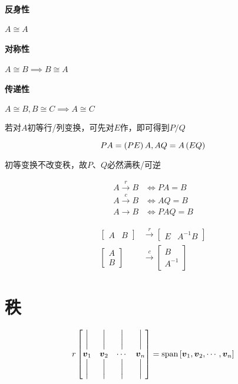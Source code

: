 \documentclass{article}
\begin{document}
\paragraph{反身性}$A\cong A$

\paragraph{对称性}$A\cong B\implies B\cong A$

\paragraph{传递性}$A\cong B,B\cong C\implies A\cong C$

若对$A$初等行/列变换，可先对$E$作，即可得到$P/Q$

\[PA=\left(PE\right)A,AQ=A\left(EQ\right)\]

初等变换不改变秩，故$P$、$Q$必然满秩/可逆

\[\begin{aligned}
        A\overset{r}\to B & \iff PA=B  \\
        A\overset{c}\to B & \iff AQ=B  \\
        A\to B            & \iff PAQ=B
    \end{aligned}\]

\[\begin{aligned}
        \begin{bmatrix}A&B\end{bmatrix}
         & \overset{r}\to
        \begin{bmatrix}E&A^{-1}B\end{bmatrix} \\
        \begin{bmatrix}A\\B\end{bmatrix}
         & \overset{c}\to\begin
        {bmatrix}B                            \\A^{-1}\end{bmatrix}
    \end{aligned}\]

\section{秩}

\begin{definition}
    \[r\begin{bmatrix}
            \bigg| & \bigg| & \bigg| & \bigg| \\
            \boldsymbol v_1   & \boldsymbol v_2   & \cdots & \boldsymbol v_n   \\
            \bigg| & \bigg| & \bigg| & \bigg|
        \end{bmatrix}
        =\mathrm{span}\left[\boldsymbol v_1,\boldsymbol v_2,\cdots,\boldsymbol v_n\right]\]
\end{definition}
\end{document}
